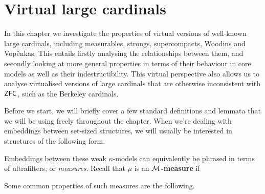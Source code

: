 \documentclass[../../main]{subfiles}
\begin{document}
\chapter{Virtual large cardinals}
\label{chapter.virtual-large-cardinals}
\thispagestyle{fancy}

In this chapter we investigate the properties of virtual versions of well-known large cardinals, including measurables, strongs, supercompacts, Woodins and Vop\v enkas. This entails firstly analysing the relationships between them, and secondly looking at more general properties in terms of their behaviour in core models as well as their indestructibility. This virtual perspective also allows us to analyse virtualised versions of large cardinals that are otherwise inconsistent with $\textsf{ZFC}$, such as the Berkeley cardinals.

\qquad Before we start, we will briefly cover a few standard definitions and lemmata that we will be using freely throughout the chapter. When we're dealing with embeddings between set-sized structures, we will usually be interested in structures of the following form.


Embeddings between these weak $\kappa$-models can equivalently be phrased in terms of ultrafilters, or \textit{measures}. Recall that $\mu$ is an \textbf{$\operatorname{\mathcal M}$-measure} if

Some common properties of such measures are the following.

\end{document}
